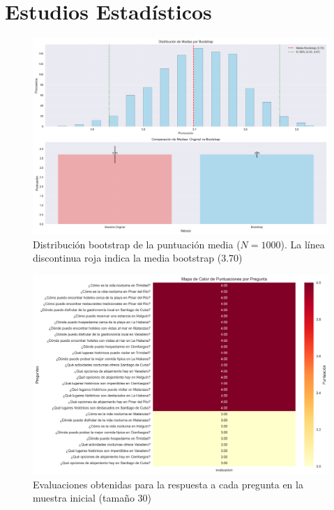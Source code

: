 \documentclass[10pt]{llncs}
\begin{document}
\section{Estudios Estadísticos}

\begin{figure}
\centering
\includegraphics[width=1\textwidth]{../src/experiments/one_only_agent/bootstrap_distribution_20250617-171514.png}
\caption{Distribución bootstrap de la puntuación media ($N=1000$). La línea discontinua roja indica la media bootstrap (3.70)}
\label{fig:boot_dist_1}
\end{figure}

\begin{figure}
\centering
\includegraphics[width=1\textwidth]{../src/experiments/one_only_agent/quality_heatmap_20250617-171514.png}
\caption{Evaluaciones obtenidas para la respuesta a cada pregunta en la muestra inicial (tamaño 30)}
\label{fig:eval_1}
\end{figure}
\end{document}
